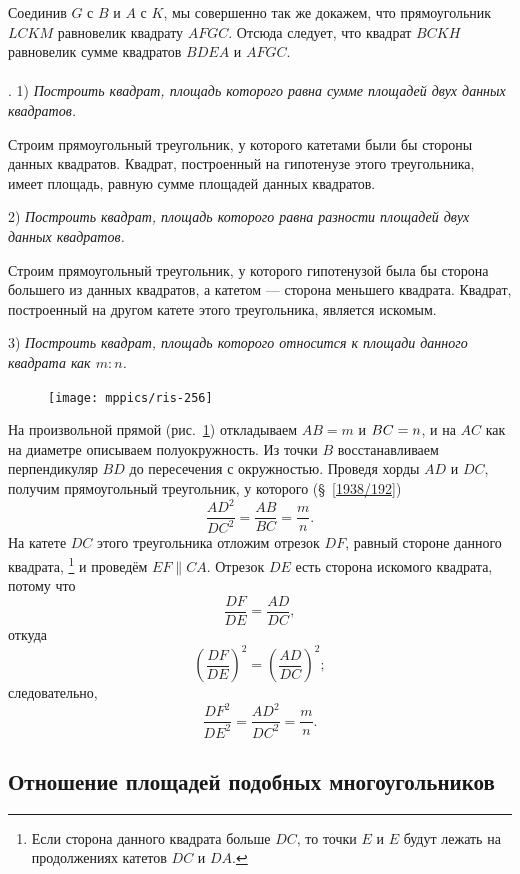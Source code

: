 \documentclass[twoside]{book}
\begin{document}
Соединив $G$ с $B$ и $A$ с $K$, мы совершенно так же докажем, что прямоугольник $LCKM$ равновелик квадрату $AFGC$.
Отсюда следует, что квадрат $BCKH$ равновелик сумме квадратов $BDEA$ и $AFGC$.


\paragraph{}\label{1938/258}
.
1) \emph{Построить квадрат, площадь которого равна сумме площадей двух данных квадратов.}

Строим прямоугольный треугольник, у которого катетами были бы стороны данных квадратов.
Квадрат, построенный на гипотенузе этого треугольника, имеет площадь, равную сумме площадей данных квадратов.

2) \emph{Построить квадрат, площадь которого равна разности площадей двух данных квадратов.}

Строим прямоугольный треугольник, у которого гипотенузой была бы сторона большего из данных квадратов, а катетом — сторона меньшего квадрата.
Квадрат, построенный на другом катете этого треугольника, является искомым.

3) \emph{Построить квадрат, площадь которого относится к площади данного квадрата как $m:n$.}


\begin{figure}
\vskip-4mm
\centering
\texttt{[image: mppics/ris-256]}
\caption{}\label{1938/ris-256}
\end{figure}

На произвольной прямой (рис.~\ref{1938/ris-256}) откладываем $AB=m$ и $BC\z=n$, и на $AC$ как на диаметре описываем полуокружность.
Из точки $B$ восстанавливаем перпендикуляр $BD$ до пересечения с окружностью.
Проведя хорды $AD$ и $DC$, получим прямоугольный треугольник, у которого (§~\ref{1938/192})
\[\frac{AD^2}{DC^2}=\frac{AB}{BC}=\frac mn.\]
На катете $DC$ этого треугольника отложим отрезок $DF$, равный стороне данного квадрата,%
\footnote{Если сторона данного квадрата больше $DC$, то точки $E$ и $E$ будут лежать на продолжениях катетов $DC$ и $DA$.}
и проведём $EF\parallel CA$.
Отрезок $DE$ есть сторона искомого квадрата, потому что
\[
\frac{DF}{DE}=\frac{AD}{DC},\]
откуда
\[\left(\frac{DF}{DE}\right)^2=\left(\frac{AD}{DC}\right)^2;\]
следовательно,
\[\frac{DF^2}{DE^2}=\frac{AD^2}{DC^2}=\frac mn.\]

\subsection*{Отношение площадей подобных многоугольников}
\end{document}
